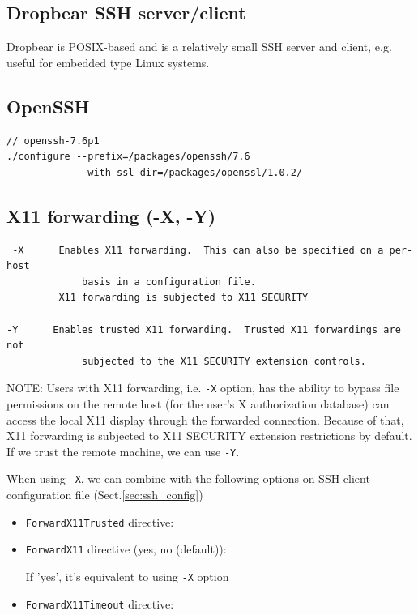 \subsection{Dropbear SSH server/client}

Dropbear is POSIX-based and is a relatively small SSH server and client, e.g.
useful for embedded type Linux systems.




\subsection{OpenSSH}
\label{sec:OpenSSH}

\begin{verbatim}
// openssh-7.6p1 
./configure --prefix=/packages/openssh/7.6
            --with-ssl-dir=/packages/openssl/1.0.2/ 
\end{verbatim}

\subsection{X11 forwarding (-X, -Y)}
\label{sec:X11-forwarding}

\begin{verbatim}
 -X      Enables X11 forwarding.  This can also be specified on a per-host
             basis in a configuration file.
         X11 forwarding is subjected to X11 SECURITY

-Y      Enables trusted X11 forwarding.  Trusted X11 forwardings are not
             subjected to the X11 SECURITY extension controls.
\end{verbatim}

NOTE: Users with X11 forwarding, i.e. \verb!-X! option, has the ability to
bypass file permissions on the remote host (for the user's X authorization
database) can access the local X11 display through the forwarded connection.
Because of that, X11 forwarding is subjected to X11 SECURITY extension
restrictions by default. If we trust the remote machine, we can use \verb!-Y!.

When using \verb!-X!, we can combine with the following options
on SSH client configuration file (Sect.\ref{sec:ssh_config})

\begin{itemize}
  \item \verb!ForwardX11Trusted! directive:
  
  \item \verb!ForwardX11! directive (yes, no (default)):
  
  If 'yes', it's equivalent to using \verb!-X! option 
  
  \item \verb!ForwardX11Timeout! directive: 
\end{itemize}


